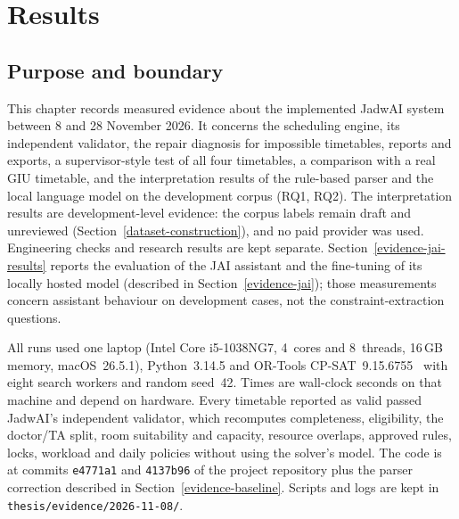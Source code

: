 \chapter{Results}\label{evidence}

\section{Purpose and boundary}
This chapter records measured evidence about the implemented JadwAI system between 8 and 28 November 2026. It concerns the scheduling engine, its independent validator, the repair diagnosis for impossible timetables, reports and exports, a supervisor-style test of all four timetables, a comparison with a real GIU timetable, and the interpretation results of the rule-based parser and the local language model on the development corpus (RQ1, RQ2). The interpretation results are development-level evidence: the corpus labels remain draft and unreviewed (Section~\ref{dataset-construction}), and no paid provider was used. Engineering checks and research results are kept separate. Section~\ref{evidence-jai-results} reports the evaluation of the JAI assistant and the fine-tuning of its locally hosted model (described in Section~\ref{evidence-jai}); those measurements concern assistant behaviour on development cases, not the constraint-extraction questions.

All runs used one laptop (Intel Core i5-1038NG7, 4~cores and 8~threads, 16\,GB memory, macOS~26.5.1), Python~3.14.5 and OR-Tools CP-SAT~9.15.6755~\cite{google_cpsat} with eight search workers and random seed~42. Times are wall-clock seconds on that machine and depend on hardware. Every timetable reported as valid passed JadwAI's independent validator, which recomputes completeness, eligibility, the doctor/TA split, room suitability and capacity, resource overlaps, approved rules, locks, workload and daily policies without using the solver's model. The code is at commits \texttt{e4771a1} and \texttt{4137b96} of the project repository plus the parser correction described in Section~\ref{evidence-baseline}. Scripts and logs are kept in \texttt{thesis/evidence/2026-11-08/}.

